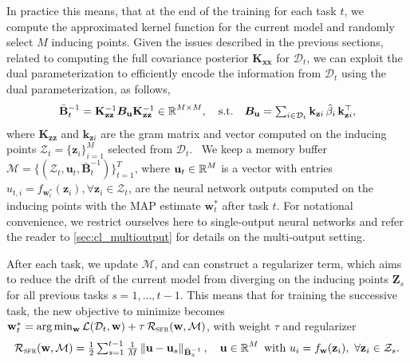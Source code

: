 \documentclass{article}
\newcommand{\our}{\textsc{sfr}\xspace}
\newcommand{\dataset}{\ensuremath{\mathcal{D}}}
\newcommand{\weights}{\ensuremath{\mathbf{w}}}
\newcommand{\mathbold}[1]{\bm{#1}}
\newcommand{\mbf}[1]{\mathbf{#1}}
\newcommand{\MB}{\mbf{B}}
\newcommand{\MZ}{\mbf{Z}}
\newcommand{\T}{\top}
\newcommand{\MBeta}[0]{\mathbold{B}}
\newcommand{\vz}{\mbf{z}}
\newcommand{\vu}{\mbf{u}}
\newcommand{\vw}{\mbf{w}}
\newcommand{\MKzz}{\mbf{K}_{\mbf{z}\mbf{z}}}
\newcommand{\MKxx}{\mbf{K}_{\mbf{x}\mbf{x}}}
\newcommand{\vkzi}{\mbf{k}_{\mbf{z}i}}
\begin{document}
In practice this means, that at the end of the training for each task $t$, we compute the approximated kernel function for the current model and randomly select $M$ inducing points. Given the issues described in the previous sections, related to computing the full covariance posterior $\MKxx$ for $\dataset_t$, we can exploit the dual parameterization to efficiently encode the information from  $\dataset_t$ using the dual parameterization, as follows, 
%
\begin{equation}\textstyle
 	\bar{\MB}^{-1}_t = \MKzz^{-1} \MBeta_\vu \MKzz^{-1} \in \R^{M \times M}, 
 	\quad \text{s.t.} \quad
 	\MBeta_{\vu} =  \sum_{i \in \dataset_t} \vkzi \,\hat{\beta}_{i} \, \vkzi^{\T} ,    
\end{equation}
%
where $\MKzz$ and $\vkzi$ are the gram matrix and vector computed on the inducing points $\mathcal{Z}_t = \{\vz_i\}_{i=1}^M$ selected from $\dataset_t$.\
%
We keep a memory buffer $\mathcal{M} = \{(\mathcal{Z}_t, \vu_t, \bar{\MB}^{-1}_t)\}_{t=1}^T$, where $\vu_t \in \R^{M}$ is a vector with entries $u_{t, i} = f_{\vw_t^*}(\vz_i), \forall \vz_i \in \mathcal{Z}_t$, are the neural network outputs computed on the inducing points with the MAP estimate $\weights_t^*$ after task $t$. For notational convenience, we restrict ourselves here to single-output neural networks and refer the reader to \cref{sec:cl_multioutput} for details on the multi-output setting. 

After each task, we update $\mathcal{M}$, and can construct a regularizer term, which aims to reduce the drift of the current model from diverging on the inducing points $\MZ_s$ for all previous tasks $ s = 1, \ldots, t-1$. This means that for training  the successive task, the new objective to minimize becomes $\weights_t^* = \arg\min_{\weights} \mathcal{L}(\mathcal{D}_t, \weights) + \tau \, \mathcal{R}_\textrm{\our}(\weights, \mathcal{M})$, with weight $\tau$ and regularizer
%
\begin{equation}\label{eq-cl-regularizer}\textstyle
  \mathcal{R}_\mathrm{\our}(\weights, \mathcal{M}) = \frac{1}{2} \sum_{s=1}^{t-1} \frac{1}{M} 
	\left\lVert 
	\vu - \vu_s %
	\right\rVert_{\bar{\MB}^{-1}_{s}}, \quad \vu \in \R^M \text{~with~} u_{i} = f_{\weights}(\vz_{i}),~\forall {\vz_i} \in \mathcal{Z}_s .
\end{equation}
\end{document}

